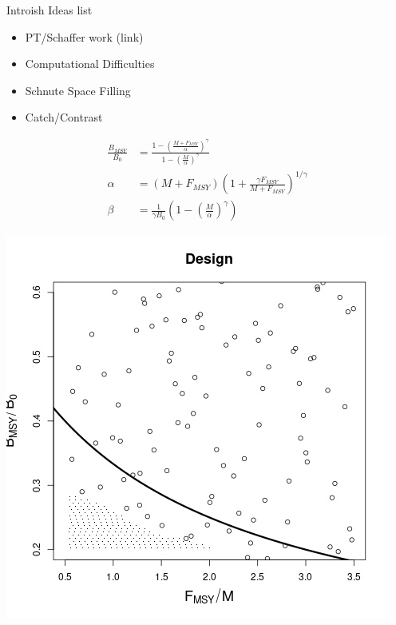 \documentclass[ xcolor = pdftex, dvipsnames, table ]{beamer}
\begin{document}
%
\begin{frame}{\color{orange} Introish Ideas list}
\begin{itemize}
\color{orange}	
	\item PT/Schaffer work (link)
	\item Computational Difficulties
	\item Schnute Space Filling
	\item Catch/Contrast
\end{itemize}
\end{frame}

%
\begin{frame}
%
\begin{minipage}[h!]{0.69\textwidth}
%
\begin{align*}
\frac{B_{MSY}}{B_0} &= \frac{1-\left(\frac{M+F_{MSY}}{\alpha}\right)^\gamma}{ 1-\left(\frac{M}{\alpha}\right)^\gamma } \\
\alpha &= (M+F_{MSY})\left(1+\frac{\gamma F_{MSY}}{M+F_{MSY}}\right)^{1/\gamma} \\
\beta &= \frac{1}{\gamma B_0}\left(1-\left(\frac{M}{\alpha}\right)^\gamma\right)
\end{align*}
%
\end{minipage}
\begin{minipage}[h!]{0.29\textwidth}
%
\includegraphics[width=\textwidth]{../gpBias/designLineHHardExpT45N150M0.3Wide.png}
\end{minipage}
\end{frame}
\end{document}
